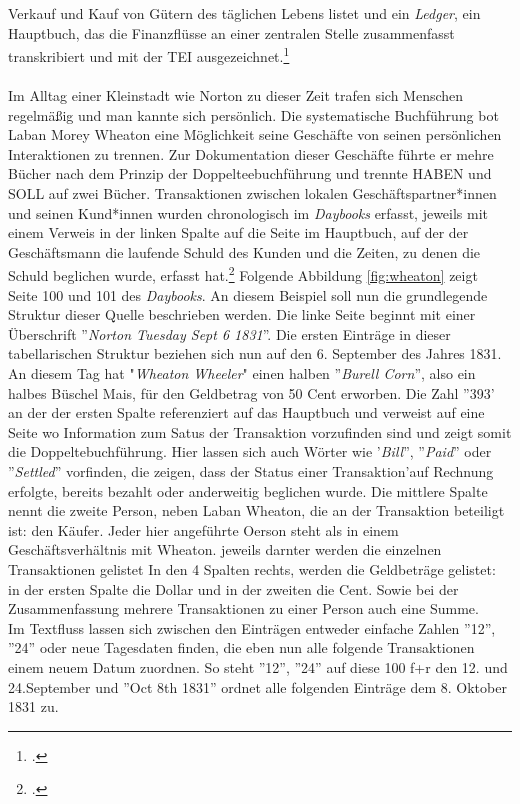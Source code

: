 \documentclass[12pt,a4paper]{article}
\begin{document}
Verkauf und Kauf von Gütern des täglichen Lebens listet und ein \textit{Ledger}, ein Hauptbuch, das die Finanzflüsse an einer zentralen Stelle zusammenfasst transkribiert und mit der TEI ausgezeichnet.\footcite[][]{tomasek2013encoding}
\\
\\
Im Alltag einer Kleinstadt wie Norton zu dieser Zeit trafen sich Menschen regelmäßig und man kannte sich persönlich. Die systematische Buchführung bot Laban Morey Wheaton eine Möglichkeit seine Geschäfte von seinen persönlichen Interaktionen zu trennen. Zur Dokumentation dieser Geschäfte führte er mehre Bücher nach dem Prinzip der Doppelteebuchführung und trennte HABEN und SOLL auf zwei Bücher. Transaktionen zwischen lokalen Geschäftspartner*innen und seinen Kund*innen wurden chronologisch im \textit{Daybooks} erfasst, jeweils mit einem Verweis in der linken Spalte auf die Seite im Hauptbuch, auf der der Geschäftsmann die laufende Schuld des Kunden und die Zeiten, zu denen die Schuld beglichen wurde, erfasst hat.\footcite[][S.7-9]{tomasek2013encoding} Folgende Abbildung \ref{fig:wheaton} zeigt Seite 100 und 101 des \textit{Daybooks}. An diesem Beispiel soll nun die grundlegende Struktur dieser Quelle beschrieben werden. Die linke Seite beginnt mit einer Überschrift ''\textit{Norton Tuesday Sept 6 1831}''. Die ersten Einträge in dieser tabellarischen Struktur beziehen sich nun auf den 6. September des Jahres 1831. An diesem Tag hat "\textit{Wheaton Wheeler}" einen halben ''\textit{Burell Corn}'', also ein halbes Büschel Mais, für den Geldbetrag von 50 Cent erworben. Die Zahl ''393' an der der ersten Spalte  referenziert auf das Hauptbuch und verweist auf eine Seite wo Information zum Satus der Transaktion vorzufinden sind und zeigt somit die Doppeltebuchführung. Hier lassen sich auch Wörter wie '\textit{Bill}'', ''\textit{Paid}'' oder ''\textit{Settled}'' vorfinden, die zeigen, dass der Status einer Transaktion'auf Rechnung erfolgte, bereits bezahlt oder anderweitig beglichen wurde. Die mittlere Spalte nennt die zweite Person, neben Laban Wheaton, die an der Transaktion beteiligt ist: den Käufer. Jeder hier angeführte Oerson steht als in einem Geschäftsverhältnis mit Wheaton. jeweils darnter werden die einzelnen Transaktionen gelistet In den 4 Spalten rechts, werden die Geldbeträge gelistet: in der ersten Spalte die Dollar und in der zweiten die Cent. Sowie bei der Zusammenfassung mehrere Transaktionen zu einer Person auch eine Summe.
\\
Im Textfluss lassen sich zwischen den Einträgen entweder einfache Zahlen ''12'', ''24'' oder neue Tagesdaten finden, die eben nun alle folgende Transaktionen einem neuem Datum zuordnen. So steht ''12'', ''24'' auf diese 100 f+r den 12. und 24.September und ''Oct 8th 1831'' ordnet alle folgenden Einträge  dem 8. Oktober 1831 zu.
\end{document}
